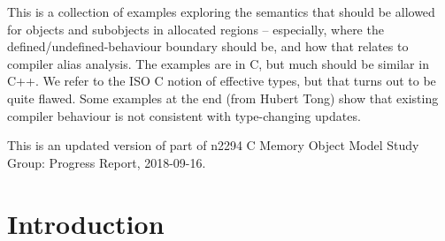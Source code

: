 \documentclass[12pt,acmsmall,review,screen]{acmart}\settopmatter{printfolios=true,printccs=false,printacmref=false}
\begin{document}




\maketitle




\newcommand{\myt}[1]{{\color{blue}#1}}
\newcommand{\myu}[1]{{\color{myudicolor}#1}}


This is a collection of examples exploring the semantics that should
be allowed for objects and subobjects in allocated regions --
especially, where the defined/undefined-behaviour boundary should be,
and how that relates to compiler alias analysis.  
The examples are in C, but much should be similar in C++. 
We refer to the ISO C notion of effective types, but that turns out to
be quite flawed. 
Some examples at the end (from Hubert Tong) show that existing
compiler behaviour is not consistent with type-changing updates. 

This is an updated version of part of n2294 C Memory Object Model Study Group:
Progress Report, 2018-09-16.  


\section{Introduction}
\end{document}
